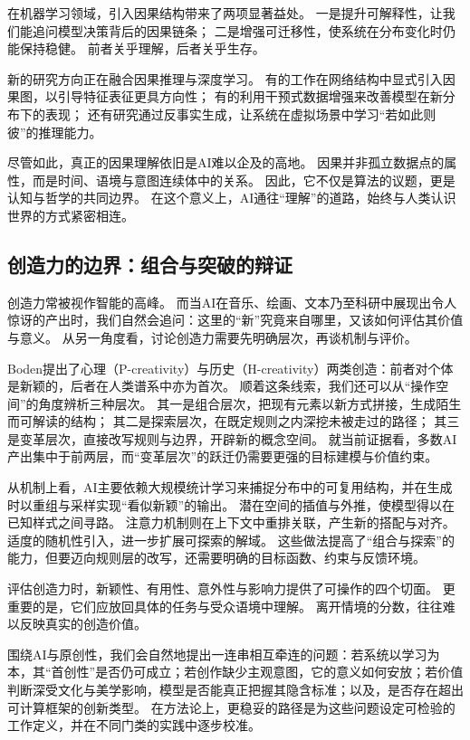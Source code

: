 在机器学习领域，引入因果结构带来了两项显著益处。
一是提升可解释性，让我们能追问模型决策背后的因果链条；
二是增强可迁移性，使系统在分布变化时仍能保持稳健。
前者关乎理解，后者关乎生存。

新的研究方向正在融合因果推理与深度学习。
有的工作在网络结构中显式引入因果图，以引导特征表征更具方向性；
有的利用干预式数据增强来改善模型在新分布下的表现；
还有研究通过反事实生成，让系统在虚拟场景中学习“若如此则彼”的推理能力。

尽管如此，真正的因果理解依旧是AI难以企及的高地。
因果并非孤立数据点的属性，而是时间、语境与意图连续体中的关系。
因此，它不仅是算法的议题，更是认知与哲学的共同边界。
在这个意义上，AI通往“理解”的道路，始终与人类认识世界的方式紧密相连。

\subsection{创造力的边界：组合与突破的辩证}

创造力常被视作智能的高峰。
而当AI在音乐、绘画、文本乃至科研中展现出令人惊讶的产出时，我们自然会追问：这里的“新”究竟来自哪里，又该如何评估其价值与意义。
从另一角度看，讨论创造力需要先明确层次，再谈机制与评价。

Boden提出了心理（P-creativity）与历史（H-creativity）两类创造：前者对个体是新颖的，后者在人类谱系中亦为首次。
顺着这条线索，我们还可以从“操作空间”的角度辨析三种层次。
其一是组合层次，把现有元素以新方式拼接，生成陌生而可解读的结构；
其二是探索层次，在既定规则之内深挖未被走过的路径；
其三是变革层次，直接改写规则与边界，开辟新的概念空间。
就当前证据看，多数AI产出集中于前两层，而“变革层次”的跃迁仍需要更强的目标建模与价值约束。

从机制上看，AI主要依赖大规模统计学习来捕捉分布中的可复用结构，并在生成时以重组与采样实现“看似新颖”的输出。
潜在空间的插值与外推，使模型得以在已知样式之间寻路。
注意力机制则在上下文中重排关联，产生新的搭配与对齐。
适度的随机性引入，进一步扩展可探索的解域。
这些做法提高了“组合与探索”的能力，但要迈向规则层的改写，还需要明确的目标函数、约束与反馈环境。

评估创造力时，新颖性、有用性、意外性与影响力提供了可操作的四个切面。
更重要的是，它们应放回具体的任务与受众语境中理解。
离开情境的分数，往往难以反映真实的创造价值。

围绕AI与原创性，我们会自然地提出一连串相互牵连的问题：若系统以学习为本，其“首创性”是否仍可成立；若创作缺少主观意图，它的意义如何安放；若价值判断深受文化与美学影响，模型是否能真正把握其隐含标准；以及，是否存在超出可计算框架的创新类型。
在方法论上，更稳妥的路径是为这些问题设定可检验的工作定义，并在不同门类的实践中逐步校准。

